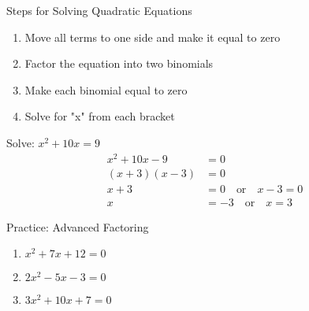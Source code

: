 \documentclass[aspectratio=169]{beamer}
\begin{document}
\begin{frame}{Steps for Solving Quadratic Equations}
    \begin{tcolorbox}[colback=lightgray,colframe=primary,title=Key Steps]
        \footnotesize
        \begin{enumerate}
            \setlength{\itemsep}{0.5em}
            \item Move all terms to one side and make it equal to zero
            \item Factor the equation into two binomials
            \item Make each binomial equal to zero
            \item Solve for "x" from each bracket
        \end{enumerate}
        
        \begin{example}
            Solve: $x^2 + 10x = 9$
            \begin{align*}
                x^2 + 10x - 9 &= 0 \\
                (x + 3)(x - 3) &= 0 \\
                x + 3 &= 0 \quad \text{or} \quad x - 3 = 0 \\
                x &= -3 \quad \text{or} \quad x = 3
            \end{align*}
        \end{example}
    \end{tcolorbox}
\end{frame}

\begin{frame}{Practice: Advanced Factoring}
    \begin{tcolorbox}[colback=lightgray,colframe=primary,title=Solve Each of the Following]
        \footnotesize
        \begin{enumerate}
            \setlength{\itemsep}{0.5em}
            \item $x^2 + 7x + 12 = 0$
            \item $2x^2 - 5x - 3 = 0$
            \item $3x^2 + 10x + 7 = 0$
        \end{enumerate}
    \end{tcolorbox}
\end{frame}
\end{document}
